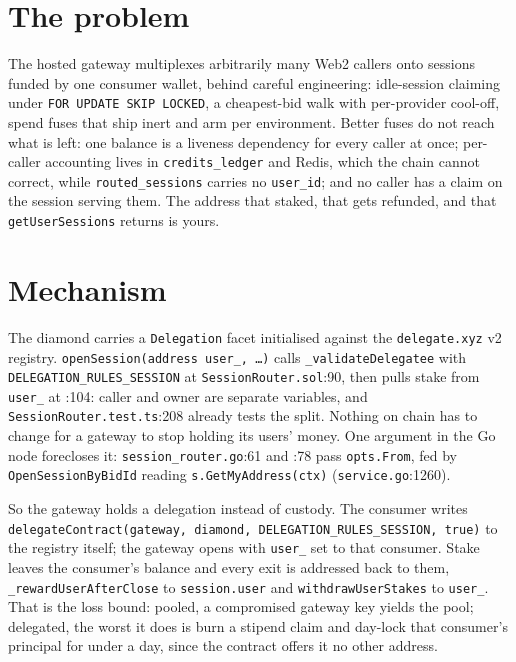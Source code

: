 \documentclass[10pt,a4paper]{article}
\begin{document}
\sloppy


\section*{The problem}

The hosted gateway multiplexes arbitrarily many Web2 callers onto sessions funded by one consumer
wallet, behind careful engineering: idle-session claiming under \texttt{FOR UPDATE SKIP LOCKED}, a
cheapest-bid walk with per-provider cool-off, spend fuses that ship inert and arm per environment.
Better fuses do not reach what is left: one balance is a liveness dependency for every caller at
once; per-caller accounting lives in \texttt{credits\_ledger} and Redis, which the chain cannot
correct, while \texttt{routed\_sessions} carries no \texttt{user\_id}; and no caller has a claim on
the session serving them. The address that staked, that gets refunded, and that
\texttt{getUserSessions} returns is yours.

\section*{Mechanism}

The diamond carries a \texttt{Delegation} facet initialised against the \texttt{delegate.xyz} v2
registry. \texttt{openSession(address user\_, \dots)} calls \texttt{\_validateDelegatee} with
\texttt{DELEGATION\_RULES\_SESSION} at \texttt{SessionRouter.sol}:90, then pulls stake from
\texttt{user\_} at :104: caller and owner are separate variables, and
\texttt{SessionRouter.test.ts}:208 already tests the split. Nothing on
chain has to change for a gateway to stop holding its users' money. One argument in the Go node
forecloses it: \texttt{session\_router.go}:61 and :78 pass \texttt{opts.From}, fed by
\texttt{OpenSessionByBidId} reading \texttt{s.GetMyAddress(ctx)} (\texttt{service.go}:1260).

So the gateway holds a delegation instead of custody. The consumer writes
\texttt{delegateContract(gateway, diamond, DELEGATION\_RULES\_SESSION, true)} to the registry
itself; the gateway opens with \texttt{user\_} set to that consumer. Stake leaves the consumer's
balance and every exit is addressed back to them, \texttt{\_rewardUserAfterClose} to
\texttt{session.user} and \texttt{withdrawUserStakes} to \texttt{user\_}. That is the loss bound:
pooled, a compromised gateway key yields the pool; delegated, the worst it does is burn a stipend
claim and day-lock that consumer's principal for under a day, since the contract offers it no
other address.
\end{document}
